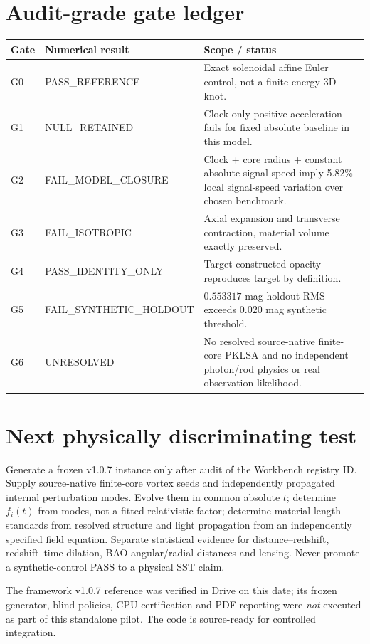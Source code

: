 \documentclass[10pt,a4paper]{article}
\begin{document}
\section{Audit-grade gate ledger}
\begin{center}\small\begin{tabular}{p{11mm}p{39mm}p{88mm}}\toprule Gate & Numerical result & Scope / status\\\midrule
G0 & PASS\_REFERENCE & Exact solenoidal affine Euler control, not a finite-energy 3D knot.\\
G1 & NULL\_RETAINED & Clock-only positive acceleration fails for fixed absolute baseline in this model.\\
G2 & FAIL\_MODEL\_CLOSURE & Clock + core radius + constant absolute signal speed imply 5.82\% local signal-speed variation over chosen benchmark.\\
G3 & FAIL\_ISOTROPIC & Axial expansion and transverse contraction, material volume exactly preserved.\\
G4 & PASS\_IDENTITY\_ONLY & Target-constructed opacity reproduces target by definition.\\
G5 & FAIL\_SYNTHETIC\_HOLDOUT & $0.553317$ mag holdout RMS exceeds $0.020$ mag synthetic threshold.\\
G6 & UNRESOLVED & No resolved source-native finite-core PKLSA and no independent photon/rod physics or real observation likelihood.\\\bottomrule\end{tabular}\end{center}
\section{Next physically discriminating test}
Generate a frozen v1.0.7 instance only after audit of the Workbench registry ID. Supply source-native finite-core vortex seeds and independently propagated internal perturbation modes. Evolve them in common absolute $t$; determine $f_i(t)$ from modes, not a fitted relativistic factor; determine material length standards from resolved structure and light propagation from an independently specified field equation. Separate statistical evidence for distance--redshift, redshift--time dilation, BAO angular/radial distances and lensing. Never promote a synthetic-control PASS to a physical SST claim.\par
The framework v1.0.7 reference was verified in Drive on this date; its frozen generator, blind policies, CPU certification and PDF reporting were \emph{not} executed as part of this standalone pilot. The code is source-ready for controlled integration.
\end{document}
